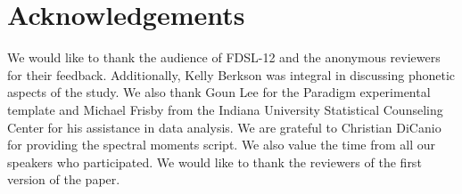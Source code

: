\documentclass[output=paper,
modfonts,
newtxmath,
hidelinks,
]{langscibook}
\begin{document}
\section*{Acknowledgements}

We would like to thank the audience of FDSL-12 and the anonymous reviewers for their feedback. Additionally, Kelly Berkson was integral in discussing phonetic aspects of the study. We also thank Goun Lee for the Paradigm experimental template and Michael Frisby from the Indiana University Statistical Counseling Center for his assistance in data analysis. We are grateful to Christian DiCanio for providing the spectral moments script. We also value the time from all our speakers who participated. We would like to thank the reviewers of the first version of the paper.

\largerpage
\sloppy
\printbibliography[heading=subbibliography,notkeyword=this]
\end{document}
